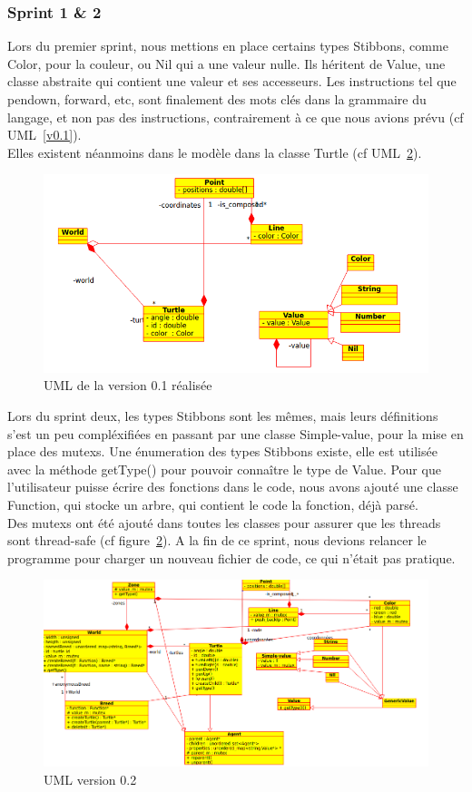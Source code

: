 \subsubsection{Sprint 1 \& 2}
Lors du premier sprint, nous mettions en place certains types Stibbons, comme Color, pour la couleur, ou Nil qui a une valeur nulle. Ils héritent de Value, une classe abstraite qui contient une valeur et ses accesseurs.
Les instructions tel que pendown, forward, etc, sont finalement des mots clés dans la grammaire du langage, et non pas des instructions, contrairement à ce que nous avions prévu (cf UML~\ref{v0.1}).\\
Elles existent néanmoins dans le modèle dans la classe Turtle (cf UML~\ref{v0.2}).

\begin{figure}[h]
\caption{\label{v0.1R} UML de la version 0.1 réalisée}
\includegraphics[scale=0.5]{doc/report/uml/v01reel.png}
\end{figure}

Lors du sprint deux, les types Stibbons sont les mêmes, mais leurs définitions s'est un peu compléxifiées en passant par une classe Simple-value, pour la mise en place des mutexs. Une énumeration des types Stibbons existe, elle est utilisée avec la méthode getType() pour pouvoir connaître le type de Value.
Pour que l'utilisateur puisse écrire des fonctions dans le code, nous avons ajouté une classe Function, qui stocke un arbre, qui contient le code la fonction, déjà parsé.
\\ Des mutexs ont été ajouté dans toutes les classes pour assurer que les threads sont thread-safe (cf figure~\ref{v0.2}).
A la fin de ce sprint, nous devions relancer le programme pour charger un nouveau fichier de code, ce qui n'était pas pratique.
\begin{figure}[h]
\caption{\label{v0.2} UML version 0.2}
\includegraphics[scale=0.45]{doc/report/uml/v02.png}
\end{figure}

